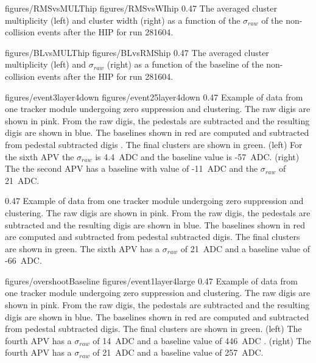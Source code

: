                  {figures/RMSvsMULThip} %
                 {figures/RMSvsWIhip} %
                 {0.47}       %
                 {The averaged cluster multiplicity (left) and cluster width (right) as a function of the $\sigma_{raw}$ of the non-collision events after the HIP for run 281604.  } %

                 {figures/BLvsMULThip} %
                 {figures/BLvsRMShip} %
                 {0.47}       %
                 { The averaged cluster multiplicity (left) and $\sigma_{raw}$ (right) as a function of the baseline  of the non-collision events after the HIP for run 281604. } %


                 {figures/event3layer4down} %
                 {figures/event25layer4down} %
                 {0.47}       %
                 {Example of data from one tracker module undergoing zero suppression and clustering. The raw digis are shown in pink. From the raw digis, the pedestals are subtracted and the resulting digis are shown in blue. The baselines shown in red are computed and subtracted from pedestal subtracted digis . The final clusters are shown in green. (left) For the sixth APV the $\sigma_{raw}$ is 4.4~ADC and the baseline value is -57~ADC. (right)  The the second APV has a baseline with value of -11~ADC and the $\sigma_{raw}$ of 21~ADC.} %

                 {0.47}       %
                 {Example of data from one tracker module undergoing zero suppression and clustering. The raw digis are shown in pink. From the raw digis, the pedestals are subtracted and the resulting digis are shown in blue. The baselines shown in red are computed and subtracted from pedestal subtracted digis. The final clusters are shown in green. The sixth APV has a $\sigma_{raw}$ of 21~ADC and a baseline value of -66~ADC.} %


                 {figures/overshootBaseline} %
                 {figures/event1layer4large} %
                 {0.47}       %
                 { Example of data from one tracker module undergoing zero suppression and clustering. The raw digis are shown in pink. From the raw digis, the pedestals are subtracted and the resulting digis are shown in blue. The baselines shown in red are computed and subtracted from pedestal subtracted digis. The final clusters are shown in green. (left) The fourth APV has a $\sigma_{raw}$ of 14~ADC and a baseline value of 446~ADC . (right)  The fourth APV has a $\sigma_{raw}$ of 21~ADC and a baseline value of 257~ADC.} %



